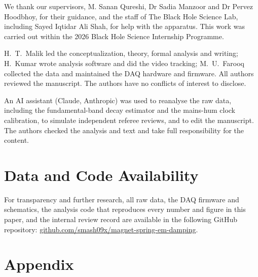 \documentclass[12pt,a4paper]{article}
\begin{document}
We thank our supervisors, M. Sanan Qureshi, Dr Sadia Manzoor and Dr Pervez Hoodbhoy, for their guidance, and the staff of The Black Hole Science Lab, including Sayed Iqtidar Ali Shah, for help with the apparatus. This work was carried out within the 2026 Black Hole Science Internship Programme.

H.~T.~Malik led the conceptualization, theory, formal analysis and writing; H.~Kumar wrote analysis software and did the video tracking; M.~U.~Farooq collected the data and maintained the DAQ hardware and firmware. All authors reviewed the manuscript. The authors have no conflicts of interest to disclose.

An AI assistant (Claude, Anthropic) was used to reanalyse the raw data, including the fundamental-band decay estimator and the mains-hum clock calibration, to simulate independent referee reviews, and to edit the manuscript. The authors checked the analysis and text and take full responsibility for the content.

\section{Data and Code Availability}

For transparency and further research, all raw data, the DAQ firmware and schematics, the analysis code that reproduces every number and figure in this paper, and the internal review record are available in the following GitHub repository: \href{https://github.com/smash09x/magnet-spring-em-damping}{github.com/smash09x/magnet-spring-em-damping}.

\printbibliography

\section{Appendix}
\end{document}
